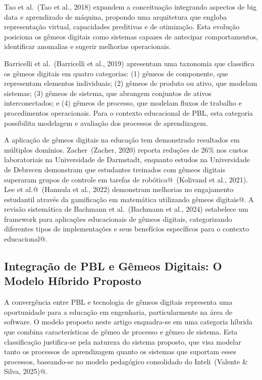 \documentclass[english, spanish, brazilian]{modelo_dt}
\begin{document}
Tao et al.\@~(Tao et al., 2018) expandem a conceituação integrando aspectos de
big data e aprendizado de máquina, propondo uma arquitetura que engloba
representação virtual, capacidades preditivas e de otimização\@. Esta evolução
posiciona os gêmeos digitais como sistemas capazes de antecipar comportamentos,
identificar anomalias e sugerir melhorias operacionais\@.

Barricelli et al.\@~(Barricelli et al., 2019) apresentam uma taxonomia que
classifica os gêmeos digitais em quatro categorias: (1) gêmeos de componente,
que representam elementos individuais; (2) gêmeos de produto ou ativo, que
modelam sistemas; (3) gêmeos de sistema, que abrangem conjuntos de ativos
interconectados; e (4) gêmeos de processo, que modelam fluxos de trabalho e
procedimentos operacionais\@. Para o contexto educacional de PBL, esta
categoria possibilita modelagem e avaliação dos processos de aprendizagem\@.

A aplicação de gêmeos digitais na educação tem demonstrado resultados em
múltiplos domínios. Zacher~(Zacher, 2020) reporta reduções de 26\% nos custos
laboratoriais na Universidade de Darmstadt, enquanto estudos na Universidade de
Debrecen demonstram que estudantes treinados com gêmeos digitais superaram
grupos de controle em tarefas de robótica@~(Kolivand et al., 2021). Lee et
al.@~(Hannula et al., 2022) demonstram melhorias no engajamento estudantil
através da gamificação em matemática utilizando gêmeos digitais@. A revisão
sistemática de Bachmann et al.~(Bachmann et al., 2024) estabelece um framework
para aplicações educacionais de gêmeos digitais, categorizando diferentes tipos
de implementações e seus benefícios específicos para o contexto educacional@.

\subsection{Integração de PBL e Gêmeos Digitais: O Modelo Híbrido Proposto}

A convergência entre PBL e tecnologia de gêmeos digitais representa uma
oportunidade para a educação em engenharia, particularmente na área de
software\@. O modelo proposto neste artigo enquadra-se em uma categoria híbrida
que combina características de gêmeo de processo e gêmeo de sistema\@. Esta
classificação justifica-se pela natureza do sistema proposto, que visa modelar
tanto os processos de aprendizagem quanto os sistemas que suportam esses
processos, baseando-se no modelo pedagógico consolidado do Inteli~(Valente \&
Silva, 2025)@.
\end{document}
